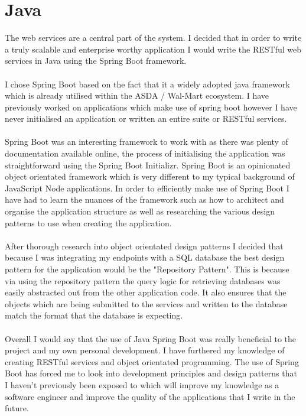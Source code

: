\documentclass[a4paper,11pt]{report}
\begin{document}
\section{Java}
The web services are a central part of the system. I decided that in order to write a truly scalable
and enterprise worthy application I would write the RESTful web services in Java using the Spring Boot\cite{spring} framework.
\\
\\
I chose Spring Boot based on the fact that it a widely adopted java framework which is already utilised
within the ASDA / Wal-Mart ecosystem. I have previously worked on applications which make use of spring
boot however I have never initialised an application or written an entire suite or RESTful services.
\\
\\
Spring Boot was an interesting framework to work with as there was plenty of documentation available online,
the process of initialising the application was straightforward using the Spring Boot Initializr. 
Spring Boot is an opinionated object orientated framework which is very different to my typical background 
of JavaScript Node applications. In order to efficiently make use of Spring Boot I have had to learn the nuances
of the framework such as how to architect and organise the application structure as well as 
researching the various design patterns to use when creating the application. 
\\
\\
After thorough research into object orientated design patterns I decided that because I was integrating my endpoints
with a SQL database the best design pattern for the application would be the "Repository Pattern". This is because 
via using the repository pattern the query logic for retrieving databases was easily abstracted out from the other 
application code. It also ensures that the objects which are being submitted to the services and written to the database
match the format that the database is expecting.
\\
\\
Overall I would say that the use of Java Spring Boot was really beneficial to the project and my own personal development. I have furthered 
my knowledge of creating RESTful services and object orientated programming. The use of Spring Boot has forced me to look into development 
principles and design patterns that I haven't previously been exposed to which will improve my knowledge as a software engineer and improve 
the quality of the applications that I write in the future.
\end{document}
